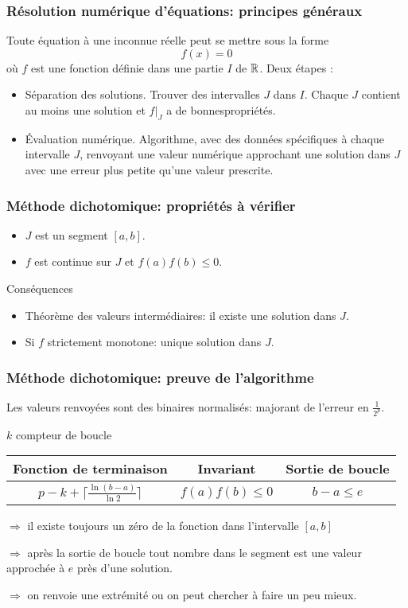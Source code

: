 
\lstset{language=Python,frame=single}

\begin{frame}
  \frametitle{Résolution numérique d'équations: principes généraux}
Toute équation à une inconnue réelle peut se mettre sous la forme
\begin{displaymath}
  f(x) = 0
\end{displaymath}
où $f$ est une fonction définie dans une partie $I$ de $\mathbb{R}$. Deux étapes :
\begin{itemize}
  \item Séparation des solutions.\newline
Trouver des intervalles $J$ dans $I$. Chaque $J$ contient au moins une solution et $f|_J$ a de \og bonnes\fg  propriétés.
  \item \'Evaluation numérique. \newline
  Algorithme, avec des données spécifiques à chaque intervalle $J$, renvoyant une valeur numérique approchant une solution dans $J$ avec une erreur plus petite qu'une valeur prescrite.
\end{itemize} 
\end{frame}

\begin{frame}
  \frametitle{Méthode dichotomique: propriétés à vérifier}
\begin{itemize}
  \item $J$ est un segment $[a,b]$.
  \item $f$ est continue sur $J$ et $f(a)f(b)\leq 0$. 
\end{itemize}
Conséquences
\begin{itemize}
  \item Théorème des valeurs intermédiaires: il existe une solution dans $J$.
  \item Si $f$ strictement monotone: unique solution dans $J$. 
\end{itemize}
\end{frame}

\begin{frame}
  \frametitle{Méthode dichotomique: preuve de l'algorithme}
Les valeurs renvoyées sont des binaires normalisés: majorant de l'erreur en $\frac{1}{2^p}$.

$k$ compteur de boucle
\begin{center}
\renewcommand{\arraystretch}{1.5}
\begin{tabular}{|c|c|c|}\hline
Fonction de terminaison                     & Invariant      & Sortie de boucle \\ \hline
$p-k + \lceil \frac{\ln(b-a)}{\ln 2}\rceil$ & $f(a)f(b)\leq 0$ & $ b - a \leq e$ \\ \hline
\end{tabular}
\end{center}
$\Rightarrow$ il existe toujours un zéro de la fonction dans l'intervalle $[a,b]$

$\Rightarrow$ après la sortie de boucle tout nombre dans le segment est une valeur approchée à $e$ près d'une solution.

$\Rightarrow$ on renvoie une extrémité ou on peut chercher à faire un peu mieux.
\end{frame}

